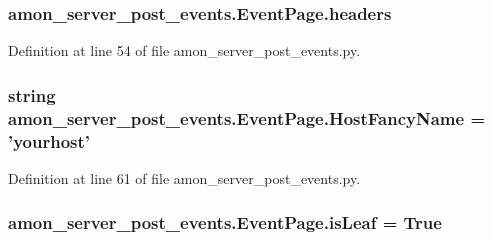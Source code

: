 \hypertarget{classamon__server__post__events_1_1_event_page_a3162cfad0f10a6d57039b849c2b2c89e}{
\subsubsection[{headers}]{\setlength{\rightskip}{0pt plus 5cm}amon\-\_\-server\-\_\-post\-\_\-events.\-Event\-Page.\-headers}}\label{classamon__server__post__events_1_1_event_page_a3162cfad0f10a6d57039b849c2b2c89e}


Definition at line 54 of file amon\-\_\-server\-\_\-post\-\_\-events.\-py.

\hypertarget{classamon__server__post__events_1_1_event_page_a850cdc5e03e4e9592dc0fd36399884cd}{
\subsubsection[{Host\-Fancy\-Name}]{\setlength{\rightskip}{0pt plus 5cm}string amon\-\_\-server\-\_\-post\-\_\-events.\-Event\-Page.\-Host\-Fancy\-Name = 'yourhost'\hspace{0.3cm}{\ttfamily [static]}}}\label{classamon__server__post__events_1_1_event_page_a850cdc5e03e4e9592dc0fd36399884cd}


Definition at line 61 of file amon\-\_\-server\-\_\-post\-\_\-events.\-py.

\hypertarget{classamon__server__post__events_1_1_event_page_a2867e0aa66087e101805e8598c4a6fbc}{
\subsubsection[{is\-Leaf}]{\setlength{\rightskip}{0pt plus 5cm}amon\-\_\-server\-\_\-post\-\_\-events.\-Event\-Page.\-is\-Leaf = True\hspace{0.3cm}{\ttfamily [static]}}}\label{classamon__server__post__events_1_1_event_page_a2867e0aa66087e101805e8598c4a6fbc}


